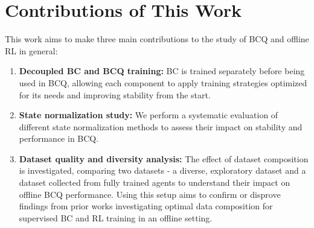 \section{Contributions of This Work}

This work aims to make three main contributions to the study of BCQ and offline RL in general:

\begin{enumerate}
    \item \textbf{Decoupled BC and BCQ training:}  
    BC is trained separately before being used in BCQ, allowing each component to apply training strategies optimized for its needs and improving stability from the start.

    \item \textbf{State normalization study:}  
    We perform a systematic evaluation of different state normalization methods to assess their impact on stability and performance in BCQ.

    \item \textbf{Dataset quality and diversity analysis:}  
    The effect of dataset composition is investigated, comparing two datasets - a diverse, exploratory dataset and a dataset collected from fully trained agents to understand their impact on offline BCQ performance. Using this setup aims to confirm or disprove findings from prior works investigating optimal data composition for supervised BC and RL training in an offline setting.
\end{enumerate}







